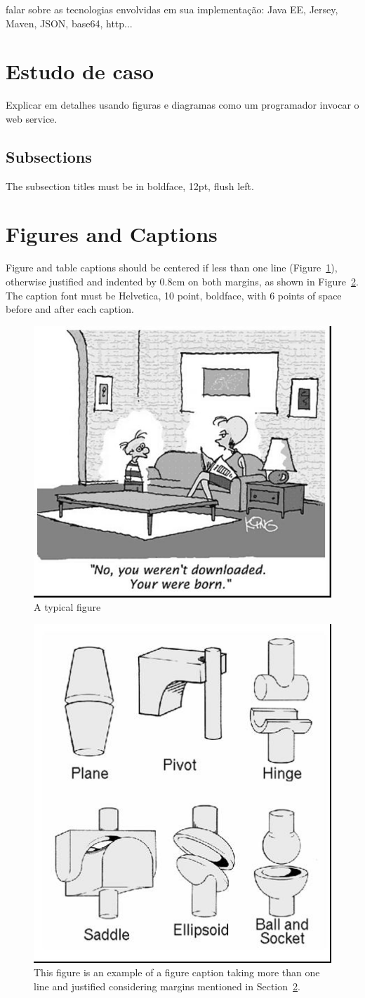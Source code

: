 \documentclass[12pt]{article}
\begin{document}
falar sobre as tecnologias envolvidas em sua implementação: Java EE, Jersey, Maven, JSON, base64, http...

\section{Estudo de caso}

Explicar em detalhes usando figuras e diagramas como um programador invocar o web service.

\subsection{Subsections}

The subsection titles must be in boldface, 12pt, flush left.

\section{Figures and Captions}\label{sec:figs}


Figure and table captions should be centered if less than one line
(Figure~\ref{fig:exampleFig1}), otherwise justified and indented by 0.8cm on
both margins, as shown in Figure~\ref{fig:exampleFig2}. The caption font must
be Helvetica, 10 point, boldface, with 6 points of space before and after each
caption.

\begin{figure}[ht]
\centering
\includegraphics[width=.5\textwidth]{fig1.jpg}
\caption{A typical figure}
\label{fig:exampleFig1}
\end{figure}

\begin{figure}[ht]
\centering
\includegraphics[width=.3\textwidth]{fig2.jpg}
\caption{This figure is an example of a figure caption taking more than one
  line and justified considering margins mentioned in Section~\ref{sec:figs}.}
\label{fig:exampleFig2}
\end{figure}
\end{document}
